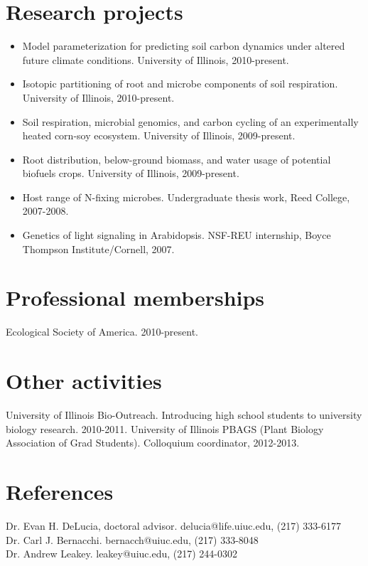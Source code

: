 \documentclass[centered,margin, 11pt]{resume}
\begin{document}
\section{Research projects}
\begin{itemize}
	\item{Model parameterization for predicting soil carbon dynamics under altered future climate conditions. University of Illinois, 2010-present.}
	\item{Isotopic partitioning of root and microbe components of soil respiration. University of Illinois, 2010-present.}
	\item{Soil respiration, microbial genomics, and carbon cycling of an experimentally heated corn-soy ecosystem. University of Illinois, 2009-present.}
	\item{Root distribution, below-ground biomass, and water usage of potential biofuels crops. University of Illinois, 2009-present.}
	\item{Host range of N-fixing microbes. Undergraduate thesis work, Reed College, 2007-2008.}
	\item{Genetics of light signaling in Arabidopsis. NSF-REU internship, Boyce Thompson Institute/Cornell, 2007.}
\end{itemize}

\section{Professional memberships}
	Ecological Society of America. 2010-present. 	
\section{Other activities}
	University of Illinois Bio-Outreach. Introducing high school students to university biology research. 2010-2011.
	University of Illinois PBAGS (Plant Biology Association of Grad Students). Colloquium coordinator, 2012-2013.
	
\section{References}
	
	Dr. Evan H. DeLucia, doctoral advisor. delucia@life.uiuc.edu, (217) 333-6177\\
	Dr. Carl J. Bernacchi. bernacch@uiuc.edu, (217) 333-8048\\
	Dr. Andrew Leakey. leakey@uiuc.edu, (217) 244-0302
\end{document}
